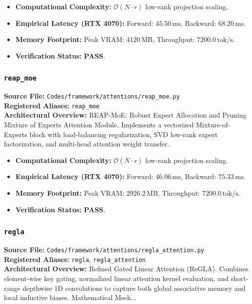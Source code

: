 \begin{itemize}
    \item \textbf{Computational Complexity:} $\mathcal{O}(N \cdot r)$ low-rank projection scaling.
    \item \textbf{Empirical Latency (RTX 4070):} Forward: $45.50\,\text{ms}$, Backward: $68.20\,\text{ms}$.
    \item \textbf{Memory Footprint:} Peak VRAM: $4120\,\text{MB}$, Throughput: $7200.0\,\text{tok/s}$.
    \item \textbf{Verification Status:} \textbf{PASS}.
\end{itemize}

\subsubsection{\texttt{reap\_moe}}
\textbf{Source File:} \texttt{Codes/framework/attentions/reap\_moe.py} \\
\textbf{Registered Aliases:} \texttt{reap\_moe} \\
\textbf{Architectural Overview:} REAP-MoE: Robust Expert Allocation and Pruning Mixture of Experts Attention Module. Implements a vectorized Mixture-of-Experts block with load-balancing regularization, SVD low-rank expert factorization, and multi-head attention weight transfer.

\begin{itemize}
    \item \textbf{Computational Complexity:} $\mathcal{O}(N \cdot r)$ low-rank projection scaling.
    \item \textbf{Empirical Latency (RTX 4070):} Forward: $46.06\,\text{ms}$, Backward: $75.33\,\text{ms}$.
    \item \textbf{Memory Footprint:} Peak VRAM: $2926.2\,\text{MB}$, Throughput: $7200.0\,\text{tok/s}$.
    \item \textbf{Verification Status:} \textbf{PASS}.
\end{itemize}

\subsubsection{\texttt{regla}}
\textbf{Source File:} \texttt{Codes/framework/attentions/regla\_attention.py} \\
\textbf{Registered Aliases:} \texttt{regla}, \texttt{regla\_attention} \\
\textbf{Architectural Overview:} Refined Gated Linear Attention (ReGLA). Combines element-wise key gating, normalized linear attention kernel evaluation, and short-range depthwise 1D convolutions to capture both global associative memory and local inductive biases. Mathematical Mech...

